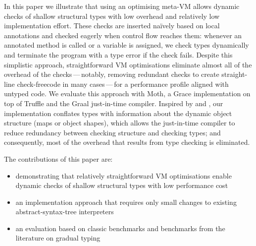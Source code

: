 In this paper we illustrate that using an optimising meta-VM allows dynamic
checks of shallow structural types with low overhead and relatively low
implementation effort. These checks are inserted na\"ively based on local
annotations and checked eagerly when control flow reaches them: whenever an
annotated method is called or a variable is assigned, we check types
dynamically and terminate the program with a type error if the check fails.
Despite this simplistic approach, straightforward VM optimisations eliminate
almost all of the overhead of the checks\,---\,notably, removing redundant
checks to create straight-line check-freecode in many cases\,---\,for a
performance profile aligned with untyped code.
%
We evaluate this approach with Moth,
a Grace implementation on top of Truffle
and the Graal just-in-time compiler\citep{Wurthinger2013,Wurthinger:2017:PPE}.
Inspired by \citet{Richards2017} and \citet{Bauman2017},
our implementation conflates types
with information about the dynamic object structure 
(maps\citep{Self} or object shapes\citep{woss2014object}), 
which allows the just-in-time compiler
to reduce redundancy between checking structure
and checking types; and consequently, most of the overhead 
that results from type checking is eliminated.



The contributions of this paper are:

\begin{itemize}
\item demonstrating that relatively straightforward VM optimisations
      enable dynamic checks of shallow structural types with low
      performance cost
\item an implementation approach that requires
      only small changes to existing abstract-syntax-tree interpreters
\item an evaluation based on classic benchmarks
      and benchmarks from the literature on gradual typing
\end{itemize}
